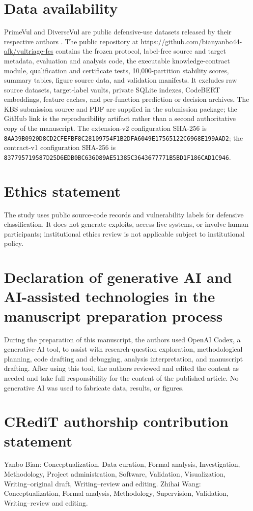 \documentclass[preprint,12pt]{elsarticle}
\begin{document}
\section*{Data availability}
PrimeVul and DiverseVul are public defensive-use datasets released by their respective authors \cite{ding2025primevul,chen2023diversevul}. The public repository at \url{https://github.com/bianyanbo44-afk/vultriage-fcs} contains the frozen protocol, label-free source and target metadata, evaluation and analysis code, the executable knowledge-contract module, qualification and certificate tests, 10,000-partition stability scores, summary tables, figure source data, and validation manifests. It excludes raw source datasets, target-label vaults, private SQLite indexes, CodeBERT embeddings, feature caches, and per-function prediction or decision archives. The KBS submission source and PDF are supplied in the submission package; the GitHub link is the reproducibility artifact rather than a second authoritative copy of the manuscript. The extension-v2 configuration SHA-256 is \texttt{8AA39B09\allowbreak{}20D8CD2C\allowbreak{}FEFBF8C2\allowbreak{}8109754F\allowbreak{}1B2DFA60\allowbreak{}49E17565\allowbreak{}122C6968\allowbreak{}E199AAD2}; the contract-v1 configuration SHA-256 is \texttt{83779571\allowbreak{}9587D25D\allowbreak{}6EDB0BC6\allowbreak{}36D89AE5\allowbreak{}1385C364\allowbreak{}3677771B\allowbreak{}5BD1F186\allowbreak{}CAD1C946}.

\section*{Ethics statement}
The study uses public source-code records and vulnerability labels for defensive classification. It does not generate exploits, access live systems, or involve human participants; institutional ethics review is not applicable subject to institutional policy.

\section*{Declaration of generative AI and AI-assisted technologies in the manuscript preparation process}
During the preparation of this manuscript, the authors used OpenAI Codex, a generative-AI tool, to assist with research-question exploration, methodological planning, code drafting and debugging, analysis interpretation, and manuscript drafting. After using this tool, the authors reviewed and edited the content as needed and take full responsibility for the content of the published article. No generative AI was used to fabricate data, results, or figures.

\section*{CRediT authorship contribution statement}
Yanbo Bian: Conceptualization, Data curation, Formal analysis, Investigation, Methodology, Project administration, Software, Validation, Visualization, Writing--original draft, Writing--review and editing. Zhihai Wang: Conceptualization, Formal analysis, Methodology, Supervision, Validation, Writing--review and editing.



\end{document}
